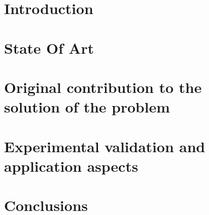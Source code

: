 \documentclass[a4paper, 12pt, oneside, hidelinks]{book}
\begin{document}

\tableofcontents
\clearpage
\sloppy
{}


\chapter{Introduction}


\chapter{State Of Art}


\chapter{Original contribution to the solution of the problem}


\chapter{Experimental validation and application aspects}




\chapter{Conclusions}




\clearpage
\listoffigures
{}

\clearpage
\listoftables
{}

\clearpage




\clearpage
\end{document}
